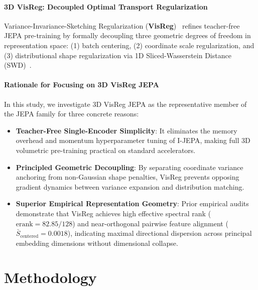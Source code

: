 \documentclass{article}
\begin{document}
\paragraph{3D VisReg: Decoupled Optimal Transport Regularization}
Variance-Invariance-Sketching Regularization (\textbf{VisReg})~\citep{wu2026visreg} refines teacher-free JEPA pre-training by formally decoupling three geometric degrees of freedom in representation space: (1) batch centering, (2) coordinate scale regularization, and (3) distributional shape regularization via 1D Sliced-Wasserstein Distance (SWD)~\citep{bonneel2015sliced,kolouri2019generalized,villani2009optimal}.

\paragraph{Rationale for Focusing on 3D VisReg JEPA}
In this study, we investigate 3D VisReg JEPA as the representative member of the JEPA family for three concrete reasons:
\begin{itemize}
    \item \textbf{Teacher-Free Single-Encoder Simplicity}: It eliminates the memory overhead and momentum hyperparameter tuning of I-JEPA, making full 3D volumetric pre-training practical on standard accelerators.
    \item \textbf{Principled Geometric Decoupling}: By separating coordinate variance anchoring from non-Gaussian shape penalties, VisReg prevents opposing gradient dynamics between variance expansion and distribution matching.
    \item \textbf{Superior Empirical Representation Geometry}: Prior empirical audits demonstrate that VisReg achieves high effective spectral rank ($\text{erank} = 82.85 / 128$) and near-orthogonal pairwise feature alignment ($\bar{S}_{\text{centered}} = 0.0018$), indicating maximal directional dispersion across principal embedding dimensions without dimensional collapse.
\end{itemize}


\section{Methodology}
\label{sec:methodology}
\end{document}
